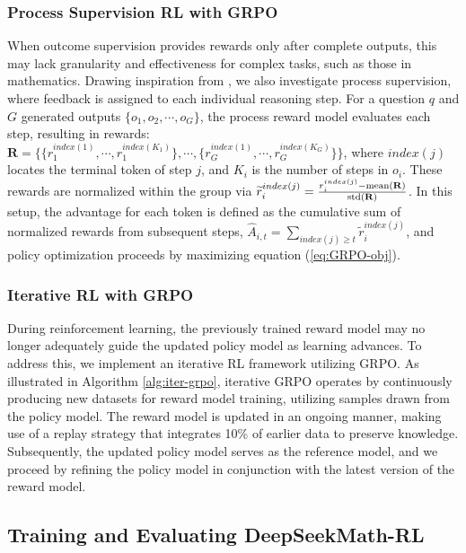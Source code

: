 \subsubsection{Process Supervision RL with GRPO} When outcome supervision provides rewards only after complete outputs, this may lack granularity and effectiveness for complex tasks, such as those in mathematics. Drawing inspiration from \cite{wang2023math}, we also investigate process supervision, where feedback is assigned to each individual reasoning step. For a question $q$ and $G$ generated outputs $\{o_1, o_2, \cdots, o_G\}$, the process reward model evaluates each step, resulting in rewards: $\mathbf{R} = \{ \{r_1^{index(1)},\cdots,r_1^{index(K_1)}\}, \cdots,  \{r_G^{index(1)},\cdots,r_G^{index(K_G)}\} \}$, where $index(j)$ locates the terminal token of step $j$, and $K_i$ is the number of steps in $o_i$. These rewards are normalized within the group via $\widetilde{r}_i^{index(j)} = \frac{r_i^{index(j)} - {\rm mean(\mathbf{R})}}{{\rm std(\mathbf{R})}}$. In this setup, the advantage for each token is defined as the cumulative sum of normalized rewards from subsequent steps, $\hat{A}_{i, t} = \sum_{index(j) \ge t} \widetilde{r}_i^{index(j)}$, and policy optimization proceeds by maximizing equation (\ref{eq:GRPO-obj}).

\subsubsection{Iterative RL with GRPO} During reinforcement learning, the previously trained reward model may no longer adequately guide the updated policy model as learning advances. To address this, we implement an iterative RL framework utilizing GRPO. As illustrated in Algorithm \ref{alg:iter-grpo}, iterative GRPO operates by continuously producing new datasets for reward model training, utilizing samples drawn from the policy model. The reward model is updated in an ongoing manner, making use of a replay strategy that integrates 10\% of earlier data to preserve knowledge. Subsequently, the updated policy model serves as the reference model, and we proceed by refining the policy model in conjunction with the latest version of the reward model.

\subsection{Training and Evaluating DeepSeekMath-RL}

